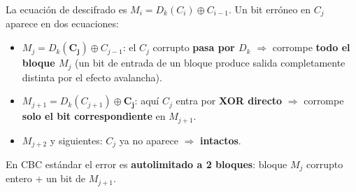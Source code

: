 \documentclass[11pt,a4paper]{article}
\begin{document}
La ecuaci\'on de descifrado es $M_i = D_k(C_i) \oplus C_{i-1}$. Un bit
erróneo en $C_j$ aparece en dos ecuaciones:

\begin{itemize}[nosep]
  \item $M_j = D_k(\mathbf{C_j}) \oplus C_{j-1}$: el $C_j$ corrupto
    \textbf{pasa por $D_k$} $\Rightarrow$ corrompe \textbf{todo el bloque
    $M_j$} (un bit de entrada de un bloque produce salida completamente
    distinta por el efecto avalancha).
  \item $M_{j+1} = D_k(C_{j+1}) \oplus \mathbf{C_j}$: aqu\'i $C_j$ entra
    por \textbf{XOR directo} $\Rightarrow$ corrompe \textbf{solo el bit
    correspondiente} en $M_{j+1}$.
  \item $M_{j+2}$ y siguientes: $C_j$ ya no aparece $\Rightarrow$
    \textbf{intactos}.
\end{itemize}

\begin{destacado}
  En CBC est\'andar el error es \textbf{autolimitado a 2 bloques}: bloque
  $M_j$ corrupto entero + un bit de $M_{j+1}$.
\end{destacado}
\end{document}
